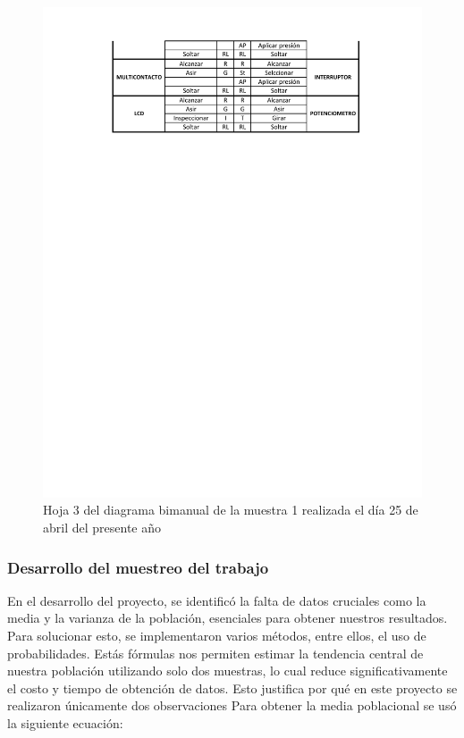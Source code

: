     \begin{figure}[H]
        \centering
        \includegraphics[trim = {1mm 180mm 1mm 1mm},clip,scale=0.45]{34/img/diagramaBimanual3.pdf}
        \caption{Hoja 3 del diagrama bimanual de la muestra 1 realizada el día 25 de abril del presente año}
        \label{fig:diagramaBimanual3}
    \end{figure}
    \subsubsection{Desarrollo del muestreo del trabajo} 
    En el desarrollo del proyecto, se identificó la falta de datos cruciales como la media y la varianza de la población, esenciales para obtener nuestros resultados. Para solucionar esto, se implementaron varios métodos, entre ellos, el uso de probabilidades.
    Estás fórmulas nos permiten estimar la tendencia central de nuestra población utilizando solo dos muestras, lo cual reduce significativamente el costo y tiempo de obtención de datos. Esto justifica por qué en este proyecto se realizaron únicamente dos observaciones
    Para obtener la media poblacional se usó la siguiente ecuación:
    
